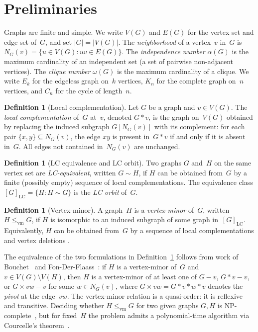 \documentclass[11pt]{amsart}
\theoremstyle{definition}
\newtheorem{definition}[theorem]{Definition}
\theoremstyle{remark}
\newcommand{\LC}{\mathrm{LC}}
\newcommand{\vm}{\leq_{\mathrm{vm}}}
\begin{document}
\section{Preliminaries}\label{sec:prelim}

Graphs are finite and simple.  We write
$V(G)$ and $E(G)$ for the vertex set and edge set of~$G$, and set
$|G|=|V(G)|$.  The \emph{neighborhood} of a vertex~$v$ in~$G$ is
$N_G(v)=\{u\in V(G):uv\in E(G)\}$.  The \emph{independence number}
$\alpha(G)$ is the maximum cardinality of an independent set (a set of
pairwise non-adjacent vertices).  The \emph{clique number} $\omega(G)$
is the maximum cardinality of a clique.  We write $E_k$ for the
edgeless graph on~$k$ vertices, $K_n$ for the complete graph on~$n$
vertices, and $C_n$ for the cycle of length~$n$.

\begin{definition}[Local complementation]\label{def:lc}
  Let $G$ be a graph and $v\in V(G)$.  The \emph{local complementation}
  of~$G$ at~$v$, denoted $G*v$, is the graph on~$V(G)$ obtained by
  replacing the induced subgraph $G[N_G(v)]$ with its complement: for
  each pair $\{x,y\}\subseteq N_G(v)$, the edge $xy$ is present
  in~$G*v$ if and only if it is absent in~$G$.  All edges not contained
  in~$N_G(v)$ are unchanged.
\end{definition}

\begin{definition}[LC equivalence and LC orbit]\label{def:lc-orbit}
  Two graphs $G$ and~$H$ on the same vertex set are
  \emph{LC-equivalent}, written $G\sim H$, if $H$ can be obtained
  from~$G$ by a finite (possibly empty) sequence of local
  complementations.  The equivalence class $[G]_{\LC}=\{H : H\sim G\}$
  is the \emph{LC orbit} of~$G$.
\end{definition}

\begin{definition}[Vertex-minor]\label{def:vm}
  A graph~$H$ is a \emph{vertex-minor} of~$G$, written $H\vm G$, if
  $H$ is isomorphic to an induced subgraph of some graph
  in~$[G]_{\LC}$.  Equivalently, $H$ can be obtained from~$G$ by a
  sequence of local complementations and vertex deletions
  \cite{Bouchet1988,FonDerFlaass1988}.
\end{definition}

The equivalence of the two formulations in Definition~\ref{def:vm}
follows from work of Bouchet~\cite{Bouchet1988} and
Fon-Der-Flaass~\cite{FonDerFlaass1988}: if $H$ is a vertex-minor
of~$G$ and $v\in V(G)\setminus V(H)$, then $H$ is a vertex-minor of at
least one of $G-v$, $G*v-v$, or $G\times vw-v$ for some $w\in N_G(v)$,
where $G\times vw=G*v*w*v$ denotes the \emph{pivot} at the edge~$vw$.
The vertex-minor relation is a quasi-order: it is reflexive and
transitive.  Deciding whether $H\vm G$ for two given graphs $G,H$ is
NP-complete~\cite{DahlbergHelsenWehner2022}, but for fixed~$H$ the
problem admits a polynomial-time algorithm via Courcelle's
theorem~\cite{CourcelleOum2007}.
\end{document}
